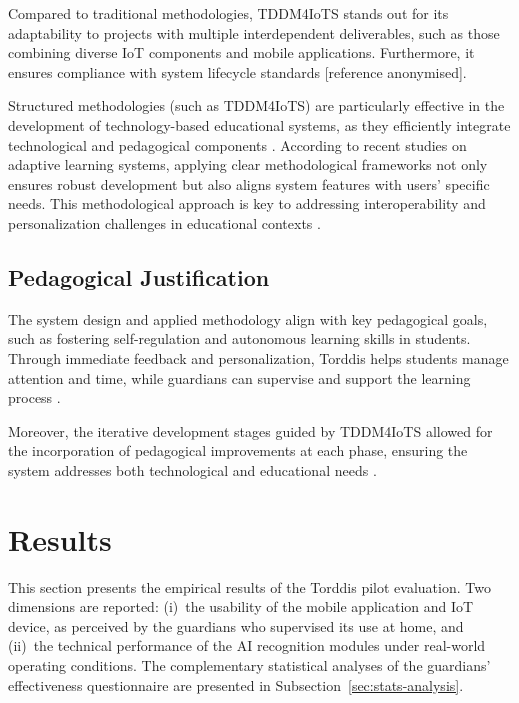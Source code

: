                 Compared to traditional methodologies, TDDM4IoTS stands out for its adaptability to projects with multiple interdependent deliverables, such as those combining diverse IoT components and mobile applications. Furthermore, it ensures compliance with system lifecycle standards [reference anonymised].
                
                Structured methodologies (such as TDDM4IoTS) are particularly effective in the development of technology-based educational systems, as they efficiently integrate technological and pedagogical components \citep{Borte2024Learning,Kirkwood2014Technology}. According to recent studies on adaptive learning systems, applying clear methodological frameworks not only ensures robust development but also aligns system features with users’ specific needs. This methodological approach is key to addressing interoperability and personalization challenges in educational contexts \citep{Wang2025Development}.
                
                \subsection{Pedagogical Justification}
                The system design and applied methodology align with key pedagogical goals, such as fostering self-regulation and autonomous learning skills in students. Through immediate feedback and personalization, Torddis helps students manage attention and time, while guardians can supervise and support the learning process \citep{Chen2025Unpacking}.
                
                Moreover, the iterative development stages guided by TDDM4IoTS allowed for the incorporation of pedagogical improvements at each phase, ensuring the system addresses both technological and educational needs \citep{Huang2025How}.
                
                \section{Results}
                \label{section:sixth}
                This section presents the empirical results of the Torddis pilot evaluation. Two dimensions are reported: (i)~the usability of the mobile application and IoT device, as perceived by the guardians who supervised its use at home, and (ii)~the technical performance of the AI recognition modules under real-world operating conditions. The complementary statistical analyses of the guardians' effectiveness questionnaire are presented in Subsection~\ref{sec:stats-analysis}.
